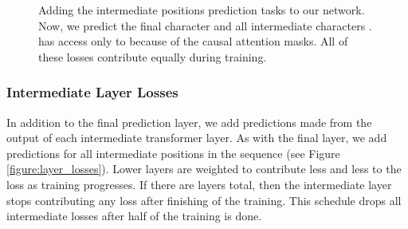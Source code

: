 \documentclass[letterpaper]{article}
\begin{document}
\begin{figure}[htb]
  \centering
  \caption{Adding the intermediate positions prediction tasks to our network. Now, we predict the final character  and all intermediate characters .  has access only to  because of the causal attention masks. All of these losses contribute equally during training.}
  \label{figure:multiple_positions}
\end{figure} 
\subsubsection{Intermediate Layer Losses}
\label{section:intermediate_layer_losses}

In addition to the final prediction layer, we add predictions made from the output of each intermediate transformer layer.
As with the final layer, we add predictions for all intermediate positions in the sequence (see Figure \ref{figure:layer_losses}).
Lower layers are weighted to contribute less and less to the loss as training progresses.
If there are  layers total, then the  intermediate layer stops contributing any loss after finishing  of the training. 
This schedule drops all intermediate losses after half of the training is done.
\end{document}
